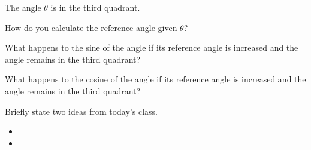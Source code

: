 \begin{problem}
  \item The angle $\theta$ is in the third quadrant.
  \begin{subproblem}
    \item How do you calculate the reference angle given $\theta$?
      \vfill
    \item What happens to the sine of the angle if its reference angle is
      increased and the angle remains in the third quadrant?
      \vfill
    \item What happens to the cosine of the angle if its reference angle is
      increased and the angle remains in the third quadrant?
      \vfill
  \end{subproblem}

\end{problem}

\postClass

\begin{problem}
\item Briefly state two ideas from today's class.
  \begin{itemize}
  \item
  \item
  \end{itemize}
\item
  \begin{subproblem}
    \item
  \end{subproblem}
\end{problem}


